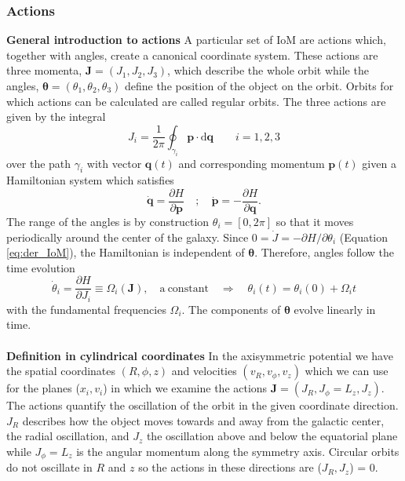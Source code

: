 \subsubsection{Actions}\label{subsubsec:actions_theo}
\textbf{General introduction to actions} A particular set of \ac{IoM} are actions which, together with angles, create a canonical coordinate system. These actions are three momenta, $\mathbf{J} = (J_1, J_2, J_3)$, which describe the whole orbit while the angles, $\bm{\theta} = (\theta_1, \theta_2, \theta_3) $ define the position of the object on the orbit. Orbits for which actions can be calculated are called regular orbits. The three actions are given by the integral
\begin{equation}
    J_i = \frac{1}{2\pi}\oint_{\gamma_i}\mathbf{p}\cdot\mathrm{d}\mathbf{q} \qquad i = 1,2,3
\end{equation}
over the path $\gamma_i$ with vector $\mathbf{q}(t)$ and corresponding momentum $\mathbf{p}(t)$ given a Hamiltonian system which satisfies 
\begin{equation}
    \dot{\mathbf{q}} = \frac{\partial H}{\partial \mathbf{p}} \quad;\quad \dot{\mathbf{p}} = - \frac{\partial H}{\partial \mathbf{q}}. 
\end{equation}
The range of the angles is by construction $\theta_i = [0,2\pi]$ so that it moves periodically around the center of the galaxy. Since $0 = \dot{J} = -\partial H / \partial\theta_i$ (Equation \ref{eq:der_IoM}), the Hamiltonian is independent of $\bm{\theta}$. Therefore, angles follow the time evolution
\begin{equation}
    \dot{\theta}_i = \frac{\partial H}{\partial J_i} \equiv \Omega_i(\mathbf{J}), \quad \mathrm{a\ constant} \quad \Rightarrow\quad \theta_i(t) = \theta_i(0) +  \Omega_i t
\end{equation}
with the fundamental frequencies $\Omega_i$. The components of $\bm{\theta}$ evolve linearly in time. 
\\\\\textbf{Definition in cylindrical coordinates} In the axisymmetric potential we have the spatial coordinates $(R, \phi, z)$ and velocities $(v_R, v_\phi, v_z)$ which we can use for the planes ($x_i, v_i$) in which we examine the actions $\mathbf{J} = (J_R, J_\phi = L_z, J_z)$. The actions quantify the oscillation of the orbit in the given coordinate direction. $J_R$ describes how the object moves towards and away from the galactic center, the radial oscillation, and $J_z$ the oscillation above and below the equatorial plane while $J_\phi = L_z$ is the angular momentum along the symmetry axis. Circular orbits do not oscillate in $R$ and $z$ so the actions in these directions are ($J_R, J_z$) = 0.

